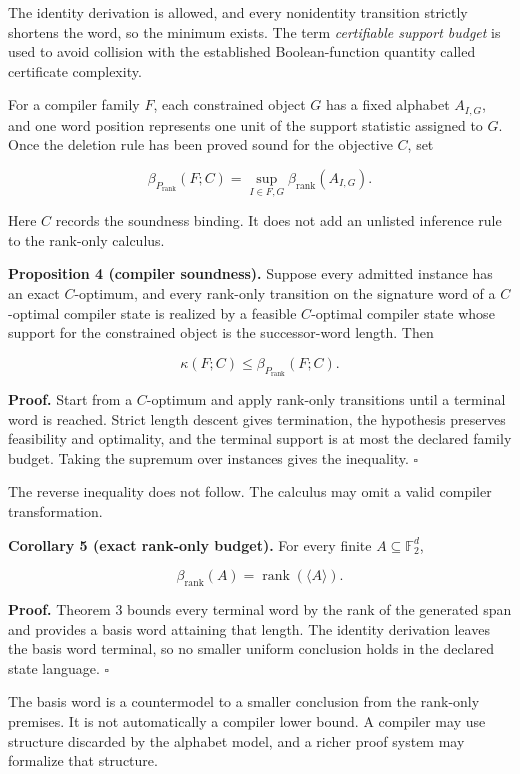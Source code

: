 \documentclass[11pt]{article}
\begin{document}
The identity derivation is allowed, and every nonidentity transition strictly shortens the word, so the minimum exists. The term \emph{certifiable support budget} is used to avoid collision with the established Boolean-function quantity called certificate complexity.

For a compiler family \(F\), each constrained object \(G\) has a fixed alphabet \(A_{I,G}\), and one word position represents one unit of the support statistic assigned to \(G\). Once the deletion rule has been proved sound for the objective \(C\), set

\[
\beta_{P_{\mathrm{rank}}}(F;C)
=
\sup_{I\in F,G}\beta_{\mathrm{rank}}(A_{I,G}).
\]

Here \(C\) records the soundness binding. It does not add an unlisted inference rule to the rank-only calculus.

\textbf{Proposition 4 (compiler soundness).} Suppose every admitted instance has an exact \(C\)-optimum, and every rank-only transition on the signature word of a \(C\)-optimal compiler state is realized by a feasible \(C\)-optimal compiler state whose support for the constrained object is the successor-word length. Then

\[
\kappa(F;C)\leq\beta_{P_{\mathrm{rank}}}(F;C).
\]

\textbf{Proof.} Start from a \(C\)-optimum and apply rank-only transitions until a terminal word is reached. Strict length descent gives termination, the hypothesis preserves feasibility and optimality, and the terminal support is at most the declared family budget. Taking the supremum over instances gives the inequality. \(\square\)

The reverse inequality does not follow. The calculus may omit a valid compiler transformation.

\textbf{Corollary 5 (exact rank-only budget).} For every finite \(A\subseteq\mathbb{F}_2^d\),

\[
\beta_{\mathrm{rank}}(A)=\operatorname{rank}(\langle A\rangle).
\]

\textbf{Proof.} Theorem 3 bounds every terminal word by the rank of the generated span and provides a basis word attaining that length. The identity derivation leaves the basis word terminal, so no smaller uniform conclusion holds in the declared state language. \(\square\)

The basis word is a countermodel to a smaller conclusion from the rank-only premises. It is not automatically a compiler lower bound. A compiler may use structure discarded by the alphabet model, and a richer proof system may formalize that structure.
\end{document}
